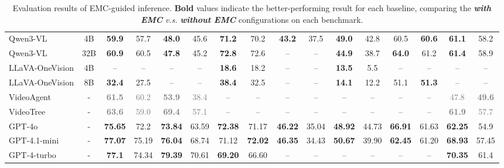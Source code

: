 \begin{table}[t]
{\begin{tabular}{l|c|cc|cc|cc|cc|cc|cc|cc}
Qwen3-VL \citep{qwen3vl} & 4B & \textbf{59.9} & 57.7 & \textbf{48.0} & 45.6 & \textbf{71.2} & 70.2 & \textbf{43.2} & 37.5 & \textbf{49.0} & 42.8 & 60.5 & \textbf{60.6} & \textbf{61.1} & 58.2 \\
Qwen3-VL \citep{qwen3vl} & 32B & \textbf{60.9} & 60.5 & \textbf{47.8} & 45.2 & \textbf{72.8} & 72.6 & -- & -- & \textbf{44.9} & 38.7 & \textbf{64.0} & 61.2 & \textbf{61.4} & 58.9 \\
LLaVA-OneVision \citep{llavaonevision} & 4B & -- & -- & -- & -- & \textbf{18.6} & 18.2 & -- & -- & \textbf{13.5} & 5.5 & -- & -- & -- & -- \\
LLaVA-OneVision \citep{llavaonevision} & 8B & \textbf{32.4} & 27.5 & -- & -- & \textbf{38.4} & 32.5 & -- & -- & \textbf{14.1} & 12.2 & 51.1 & \textbf{51.3} & -- & -- \\
\midrule
VideoAgent \citep{VideoAgent} & - & \textcolor{gray}{\textbf{61.5}} & \textcolor{gray}{60.2} & \textcolor{gray}{\textbf{53.9}} & \textcolor{gray}{38.4} & -- & -- & -- & -- & -- & -- & -- & -- & \textcolor{gray}{47.8} & \textcolor{gray}{\textbf{49.6}} \\
VideoTree \citep{wang2024videotreeadaptivetreebasedvideo} & - & \textcolor{gray}{\textbf{63.6}} & \textcolor{gray}{59.0} & \textcolor{gray}{\textbf{69.4}} & \textcolor{gray}{57.1} & -- & -- & -- & -- & -- & -- & -- & -- & \textcolor{gray}{\textbf{61.9}} & \textcolor{gray}{57.7} \\
\midrule
GPT-4o \citep{gpt4o} & - & \textbf{75.65} & 72.2 & \textbf{73.84} & 63.59 & \textbf{72.38} & 71.17 & \textbf{46.22} & 35.04 & \textbf{48.92} & 44.73 & \textbf{66.91} & 61.63 & \textbf{62.25} & 54.9 \\
GPT-4.1-mini \citep{gpt4} & - & \textbf{77.07} & 75.19 & \textbf{76.04} & 68.74 & 71.12 & \textbf{72.02} & \textbf{46.35} & 34.43 & \textbf{50.67} & 39.90 & \textbf{62.45} & 61.20 & \textbf{68.93} & 57.45 \\
GPT-4-turbo \citep{gpt4} & - & \textbf{77.1} & 74.34 & \textbf{79.39} & 70.61 & \textbf{69.20} & 66.60 & -- & -- & -- & -- & -- & -- & \textbf{70.35} & 61.4 \\
\bottomrule
\end{tabular}
}
\caption{Evaluation results of EMC-guided inference. \textbf{Bold} values indicate the better-performing result for each baseline, comparing the \textit{\textbf{with EMC}} \textit{v.s.} \textit{\textbf{without EMC}} configurations on each benchmark.}
\label{stage2_eval}
\vspace{-0.3em}
\end{table}


